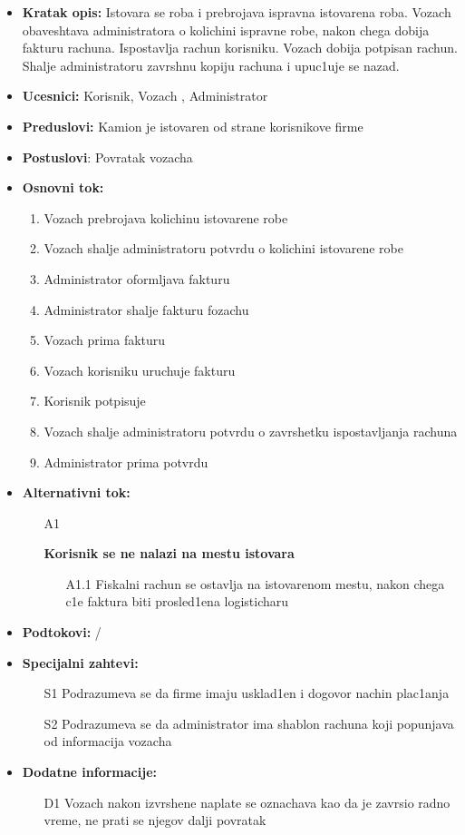 
\begin{itemize}
	\item {\textbf{Kratak opis:}  Istovara se roba i prebrojava ispravna istovarena roba. Vozach obaveshtava administratora o kolichini ispravne robe, nakon chega dobija fakturu rachuna. Ispostavlja rachun korisniku. Vozach dobija potpisan rachun. Shalje administratoru zavrshnu kopiju rachuna i upuc1uje se nazad.}
	\item{\textbf{Ucesnici:} Korisnik, Vozach , Administrator}
	\item{\textbf{Preduslovi:} Kamion je istovaren od strane korisnikove firme }
	\item{\textbf{Postuslovi}: Povratak vozacha}
	\item{\textbf{Osnovni tok:}  \begin{enumerate}
				\item {Vozach prebrojava kolichinu istovarene robe}
				\item{Vozach shalje administratoru potvrdu o kolichini istovarene robe}
				\item{Administrator oformljava fakturu}
				\item{Administrator shalje fakturu fozachu}
				\item{Vozach prima fakturu}
				\item{Vozach korisniku uruchuje fakturu}
				\item {Korisnik potpisuje}
				\item{Vozach shalje administratoru potvrdu o zavrshetku ispostavljanja rachuna}
				\item {Administrator prima potvrdu}
	\end{enumerate}
			}
\item{\textbf{Alternativni tok:}
	 \begin{enumerate}
		\item[A{1}]{\textbf{Korisnik se ne nalazi na mestu istovara} 
			\begin{itemize}
				\item[A{1.1}]{Fiskalni rachun se ostavlja na istovarenom mestu, nakon chega c1e faktura biti prosled1ena logisticharu}
			\end{itemize}	
						}
	\end{enumerate}
		}
\item{\textbf{Podtokovi:} /}
\item{\textbf{Specijalni zahtevi:} 
			\begin{itemize}
				\item[S{1}]{Podrazumeva se da firme imaju usklad1en i dogovor nachin plac1anja}
				\item[S{2}]{Podrazumeva se da administrator ima shablon rachuna koji popunjava od informacija vozacha}
		\end{itemize}
	
}
\item{\textbf{Dodatne informacije:} 
					\begin{itemize}
						\item[D{1}]{Vozach nakon izvrshene naplate se oznachava kao da je zavrsio radno vreme, ne prati se njegov dalji povratak}
					\end{itemize}
}

\end{itemize}
